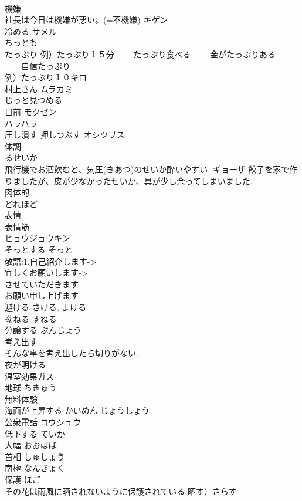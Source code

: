 \documentclass[8pt]{extreport}
\begin{document}
\begin{CJK}{UTF8}{min}
\\	機嫌 
\\	社長は今日は機嫌が悪い。(=不機嫌)	キゲン 
\\	冷める	サメル 
\\	ちっとも	
\\	たっぷり 例）たっぷり１５分 　　たっぷり食べる 　　金がたっぷりある 　　自信たっぷり	
\\	例）たっぷり１０キロ 
\\	村上さん	ムラカミ
\\	じっと見つめる	
\\	目前	モクゼン 
\\	ハラハラ	
\\	圧し潰す 押しつぶす	オシツブス 
\\	体調	
\\	るせいか	
\\	飛行機でお酒飲むと、気圧(きあつ)のせいか酔いやすい. ギョーザ 餃子を家で作りましたが、皮が少なかったせいか、具が少し余ってしまいました. 
\\	肉体的	
\\	どれほど	
\\	表情 
\\	表情筋	
\\	ヒョウジョウキン　
\\	そっとする そっと	
\\	敬語:1.自己紹介します-> 
\\	宜しくお願いします->	
\\	させていただきます 
\\	お願い申し上げます
\\	避ける	さける, よける
\\	拗ねる	すねる 
\\	分譲する	ぶんじょう 
\\	考え出す	
\\	そんな事を考え出したら切りがない. 
\\	夜が明ける	
\\	温室効果ガス	
\\	地球	ちきゅう 
\\	無料体験	
\\	海面が上昇する	かいめん じょうしょう 
\\	公衆電話	コウシュウ 
\\	低下する	ていか 
\\	大幅	おおはば 
\\	首相	しゅしょう 
\\	南極	なんきょく 
\\	保護	ほご 
\\	その花は雨風に晒されないように保護されている 晒す）さらす

\end{CJK}
\end{document}
